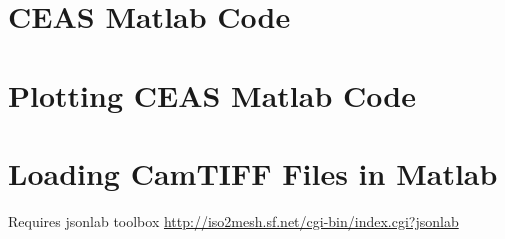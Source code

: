 \section{CEAS Matlab Code}



\section{Plotting CEAS Matlab Code}



\section{Loading CamTIFF Files in Matlab}

Requires jsonlab toolbox \url{http://iso2mesh.sf.net/cgi-bin/index.cgi?jsonlab}



